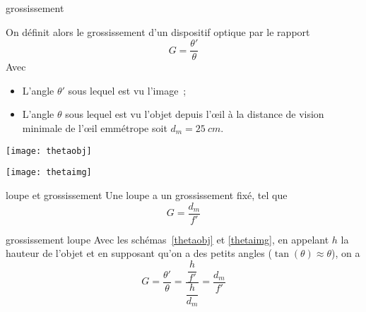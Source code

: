 \documentclass[../main/main.tex]{subfiles}
\begin{document}
\begin{tcbraster}[raster columns=3, raster equal height=rows]
    \begin{defi}[label=def_gross, raster multicolumn=2, sidebyside]{grossissement}

        On définit alors le grossissement d'un dispositif optique par le rapport 
        \begin{equation*}
            \boxed{G = \frac{\theta'}{\theta}}
        \end{equation*}
        Avec
        \begin{itemize}
            \item L'angle $\theta'$ sous lequel est vu l'image~;
            \item L'angle $\theta$ sous lequel est vu l'objet depuis l'œil à la
                distance de vision minimale de l'œil emmétrope soit $d_m
                = \SI{25}{cm}$.
        \end{itemize}
        \tcblower
        \begin{center}
            \texttt{[image: thetaobj]}
            \label{thetaobj}
        \end{center}
        \begin{center}
            \texttt{[image: thetaimg]}
            \label{thetaimg}
        \end{center}
    \end{defi}
    \begin{tcolorbox}[blankest, raster multicolumn=1]
        \begin{tcbraster}[raster columns=1]
            \begin{prop}[label=prop_loupe]{loupe et grossissement}
                Une loupe a un grossissement fixé, tel que
                \begin{equation*}
                    \boxed{G = \frac{d_m}{f'}}
                \end{equation*}
            \end{prop}
            \begin{demo}[label=demo_gross-loupe]{grossissement loupe}
                Avec les schémas~\ref{thetaobj} et \ref{thetaimg}, en
                appelant $h$ la hauteur de l'objet et en supposant qu'on a des
                petits angles ($\tan(\theta)\approx\theta$), on a
                \begin{equation*}
                    G = \frac{\theta'}{\theta} = \frac{\dfrac{h}{f'}}{\dfrac{h}{d_m}}
                    = \frac{d_m}{f'}
                \end{equation*}
            \end{demo}
        \end{tcbraster}
    \end{tcolorbox}
\end{tcbraster}
\end{document}
